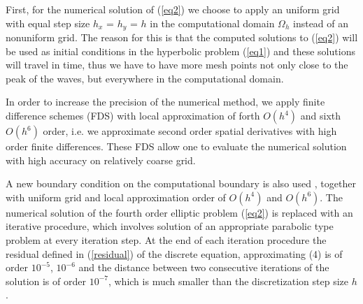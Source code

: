 \documentclass[leqno,11pt]{book}
\newcommand{\rf}[1]{(\ref{#1})}
\begin{document}
First, for the numerical solution of \rf{eq2} we choose to apply an uniform grid with equal step size $h_x$ = $h_y$ = $h$ in the computational domain $\Omega_h$ instead of an nonuniform grid. The reason for this is that  
%
 the computed solutions to \rf{eq2} will be used as initial conditions in the hyperbolic problem \rf{eq1} and these solutions will travel in time, thus we have to have more mesh points not only close to the peak of the waves, but everywhere in   the  computational domain. 

In order to increase the precision of the numerical method, we apply finite difference schemes (FDS) with local approximation of forth $O(h^4)$ and sixth $O(h^6)$ order, i.e. we  approximate second order spatial derivatives with high order finite differences. These  FDS allow one to evaluate the numerical solution with high accuracy on relatively coarse grid. 

A new boundary condition on the computational boundary is also used \cite{bnd}, together with uniform grid and local approximation order of $O(h^4)$ and $O(h^6)$. The numerical solution of the fourth order elliptic problem \rf{eq2} is replaced with an iterative procedure, which involves solution  of an appropriate  parabolic type problem at every iteration step. %
At the end of each iteration procedure the residual defined in \rf{residual}  of the discrete equation, approximating (4) is of order $10^{-5}$, $10^{-6}$ and the distance between two consecutive iterations of the solution is of order $10^{-7}$, which is much smaller than the discretization step size $h$.
 
\end{document}
